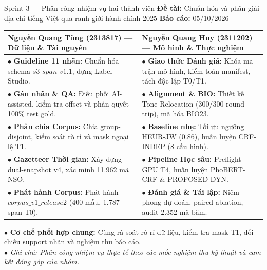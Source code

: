 \documentclass[aspectratio=169, 9pt]{beamer}
\begin{document}
\begin{frame}{Sprint 3 — Phân công nhiệm vụ hai thành viên}
  \vspace{-0.15cm}
  {\fontsize{8pt}{9.5pt}\selectfont\textbf{Đề tài:} Chuẩn hóa và phân giải địa chỉ tiếng Việt qua ranh giới hành chính 2025 \hfill \textbf{Báo cáo:} 05/10/2026}\\[0.1cm]
  {\fontsize{8.2pt}{10.5pt}\selectfont
  \begin{tabularx}{\textwidth}{>{\raggedright\arraybackslash}X | >{\raggedright\arraybackslash}X}
    \rowcolor{tableheader}
    \textbf{Nguyễn Quang Tùng (2313817) --- Dữ liệu \& Tài nguyên} & \textbf{Nguyễn Quang Huy (2311202) --- Mô hình \& Thực nghiệm} \\
    \midrule
    $\bullet$ \textbf{Guideline 11 nhãn:} Chuẩn hóa schema $s3\text{-}span\text{-}v1.1$, dựng Label Studio. &
    $\bullet$ \textbf{Giao thức Đánh giá:} Khóa ma trận mô hình, kiểm toán manifest, tách độc lập T0/T1. \\
    \addlinespace[3pt]
    $\bullet$ \textbf{Gán nhãn \& QA:} Điều phối AI-assisted, kiểm tra offset và phán quyết 100\% test gold. &
    $\bullet$ \textbf{Alignment \& BIO:} Thiết kế Tone Relocation (300/300 round-trip), mã hóa BIO23. \\
    \addlinespace[3pt]
    $\bullet$ \textbf{Phân chia Corpus:} Chia group-disjoint, kiểm soát rò rỉ và mask ngoại lệ T1. &
    $\bullet$ \textbf{Baseline nhẹ:} Tối ưu ngưỡng HEUR-JW (0.86), huấn luyện CRF-INDEP (8 cấu hình). \\
    \addlinespace[3pt]
    $\bullet$ \textbf{Gazetteer Thời gian:} Xây dựng dual-snapshot v4, xác minh 11.962 mã NSO. &
    $\bullet$ \textbf{Pipeline Học sâu:} Preflight GPU T4, huấn luyện PhoBERT-CRF \& PROPOSED-DYN. \\
    \addlinespace[3pt]
    $\bullet$ \textbf{Phát hành Corpus:} Phát hành $corpus\_v1\_release2$ (400 mẫu, 1.787 span T0). &
    $\bullet$ \textbf{Đánh giá \& Tái lập:} Niêm phong dự đoán, paired ablation, audit 2.352 mã băm. \\
    \bottomrule
  \end{tabularx}
  }
  \vspace{0.15cm}
  {\fontsize{7.5pt}{9.5pt}\selectfont
  $\bullet$ \textbf{Cơ chế phối hợp chung:} Cùng rà soát rò rỉ dữ liệu, kiểm tra mask T1, đối chiếu support nhãn và nghiệm thu báo cáo.\\[1.5pt]
  $\bullet$ \textit{\color{gray} Ghi chú: Phân công nhiệm vụ thực tế theo các mốc nghiệm thu kỹ thuật và cam kết đóng góp của nhóm.}
  }
\end{frame}
\end{document}
